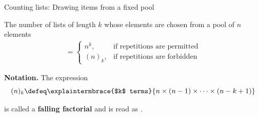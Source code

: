 \documentclass[dvipsnames, 10pt]{beamer}
\begin{document}
\begin{frame}{Counting lists: Drawing items from a fixed pool}

\begin{mygreenbox}[title= Theorem 8.6 from Scheinerman]
The number of lists of length $k$ whose elements are chosen from a pool of $n$ elements 
%
\begin{align*}
= \begin{cases}
 n^k, & \text{if repetitions are permitted} \\
 (n)_k, & \text{if repetitions are forbidden}	
 \end{cases}
\end{align*}
\end{mygreenbox}

\pause \vfill 

\colorbox{red!30}{\textbf{Notation.}} The expression
\[  (n)_k \defeq \explaintermbrace{$k$ terms}{n \times (n-1) \times \cdots \times (n-k+1)}\]

is called a \textbf{falling factorial} and is read as .

%

\end{frame}
\end{document}
